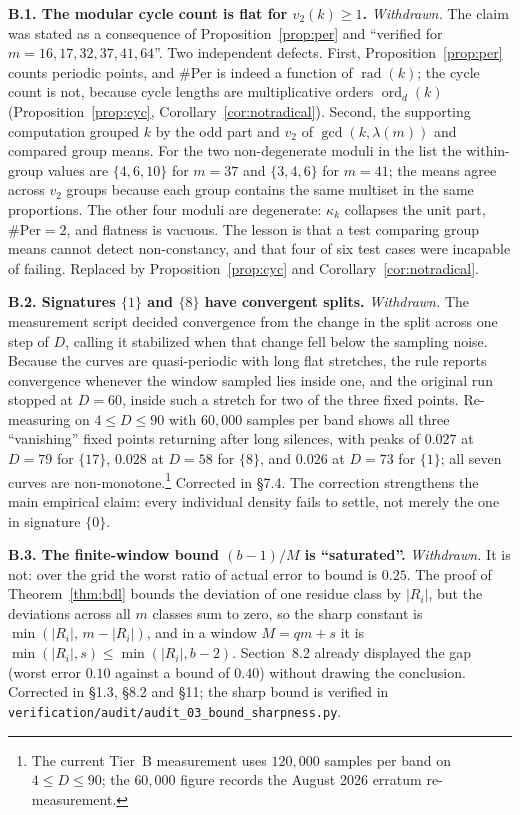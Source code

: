 \documentclass[11pt]{article}
\theoremstyle{definition}
\theoremstyle{remark}
\newcommand{\Per}{\mathrm{Per}}
\DeclareMathOperator{\ord}{ord}
\DeclareMathOperator{\rad}{rad}
\begin{document}
\medskip
\noindent\textbf{B.1. The modular cycle count is flat for $v_2(k) \ge 1$.} \emph{Withdrawn.} The claim was stated as a consequence of Proposition~\ref{prop:per} and ``verified for $m = 16, 17, 32, 37, 41, 64$''. Two independent defects. First, Proposition~\ref{prop:per} counts periodic points, and $\#\Per$ is indeed a function of $\rad(k)$; the cycle count is not, because cycle lengths are multiplicative orders $\ord_d(k)$ (Proposition~\ref{prop:cyc}, Corollary~\ref{cor:notradical}). Second, the supporting computation grouped $k$ by the odd part and $v_2$ of $\gcd(k,\lambda(m))$ and compared group means. For the two non-degenerate moduli in the list the within-group values are $\{4,6,10\}$ for $m=37$ and $\{3,4,6\}$ for $m=41$; the means agree across $v_2$ groups because each group contains the same multiset in the same proportions. The other four moduli are degenerate: $\kappa_k$ collapses the unit part, $\#\Per = 2$, and flatness is vacuous. The lesson is that a test comparing group means cannot detect non-constancy, and that four of six test cases were incapable of failing. Replaced by Proposition~\ref{prop:cyc} and Corollary~\ref{cor:notradical}.

\medskip
\noindent\textbf{B.2. Signatures $\{1\}$ and $\{8\}$ have convergent splits.} \emph{Withdrawn.} The measurement script decided convergence from the change in the split across one step of $D$, calling it stabilized when that change fell below the sampling noise. Because the curves are quasi-periodic with long flat stretches, the rule reports convergence whenever the window sampled lies inside one, and the original run stopped at $D = 60$, inside such a stretch for two of the three fixed points. Re-measuring on $4 \le D \le 90$ with $60{,}000$ samples per band shows all three ``vanishing'' fixed points returning after long silences, with peaks of $0.027$ at $D = 79$ for $\{17\}$, $0.028$ at $D = 58$ for $\{8\}$, and $0.026$ at $D = 73$ for $\{1\}$; all seven curves are non-monotone.\footnote{The current Tier~B measurement uses $120{,}000$ samples per band on $4 \le D \le 90$; the $60{,}000$ figure records the August 2026 erratum re-measurement.} Corrected in \S7.4. The correction strengthens the main empirical claim: every individual density fails to settle, not merely the one in signature $\{0\}$.

\medskip
\noindent\textbf{B.3. The finite-window bound $(b-1)/M$ is ``saturated''.} \emph{Withdrawn.} It is not: over the grid the worst ratio of actual error to bound is $0.25$. The proof of Theorem~\ref{thm:bdl} bounds the deviation of one residue class by $|R_i|$, but the deviations across all $m$ classes sum to zero, so the sharp constant is $\min(|R_i|,\,m-|R_i|)$, and in a window $M = qm + s$ it is $\min(|R_i|, s) \le \min(|R_i|, b-2)$. Section~8.2 already displayed the gap (worst error $0.10$ against a bound of $0.40$) without drawing the conclusion. Corrected in \S1.3, \S8.2 and \S11; the sharp bound is verified in \texttt{verification/audit/audit\_03\_bound\_sharpness.py}.
\end{document}
